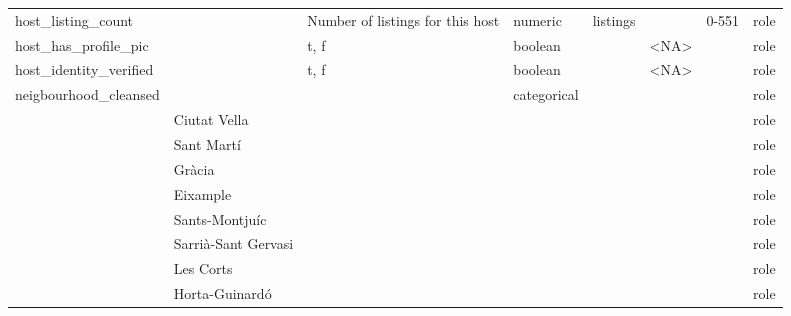 \begin{center}
\begin{longtable}{@{}llllllll@{}}
host\_listing\_count        &                             & Number of listings for this host & numeric     & listings       &                             &                     0-551   & role \\
host\_has\_profile\_pic     &                             & t, f & boolean     &                & \textless{}NA\textgreater{} &                     & role \\
host\_identity\_verified    &                             & t, f & boolean     &                & \textless{}NA\textgreater{} &                     & role \\
neigbourhood\_cleansed      &                             &                                   & categorical &                &                             &                     & role \\
                            & Ciutat Vella                &                                   &             &                &                             &                     & role \\
                            & Sant Martí                  &                                   &             &                &                             &                     & role \\
                            & Gràcia                      &                                   &             &                &                             &                     & role \\
                            & Eixample                    &                                   &             &                &                             &                     & role \\
                            & Sants-Montjuíc              &                                   &             &                &                             &                     & role \\
                            & Sarrià-Sant Gervasi         &                                   &             &                &                             &                     & role \\
                            & Les Corts                   &                                   &             &                &                             &                     & role \\
                            & Horta-Guinardó              &                                   &             &                &                             &                     & role \\

\end{longtable}
\end{center}
